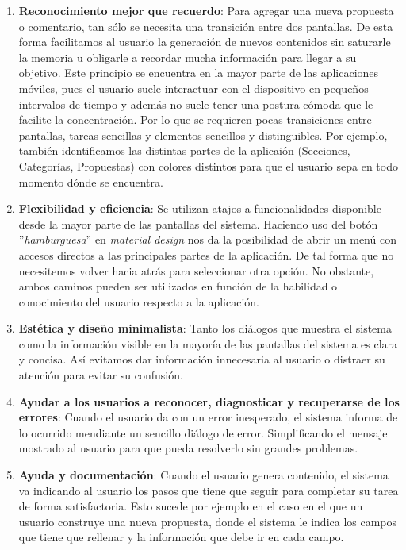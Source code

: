 \begin{enumerate}
  \item \textbf{Reconocimiento mejor que recuerdo}: Para agregar una nueva propuesta o comentario, tan sólo se necesita una transición entre dos pantallas. De esta forma facilitamos al usuario la generación de nuevos contenidos sin saturarle la memoria u obligarle a recordar mucha información para llegar a su objetivo. Este principio se encuentra en la mayor parte de las aplicaciones móviles, pues el usuario suele interactuar con el dispositivo en pequeños intervalos de tiempo y además no suele tener una postura cómoda que le facilite la concentración. Por lo que se requieren pocas transiciones entre pantallas, tareas sencillas y elementos sencillos y distinguibles. Por ejemplo, también identificamos las distintas partes de la aplicaión (Secciones, Categorías, Propuestas) con colores distintos para que el usuario sepa en todo momento dónde se encuentra.
  \item \textbf{Flexibilidad y eficiencia}: Se utilizan atajos a funcionalidades disponible desde la mayor parte de las pantallas del sistema. Haciendo uso del botón ''\textit{hamburguesa}'' en \textit{material design} nos da la posibilidad de abrir un menú con accesos directos a las principales partes de la aplicación. De tal forma que no necesitemos volver hacia atrás para seleccionar otra opción. No obstante, ambos caminos pueden ser utilizados en función de la habilidad o conocimiento del usuario respecto a la aplicación.
  \item \textbf{Estética y diseño minimalista}: Tanto los diálogos que muestra el sistema como la información visible en la mayoría de las pantallas del sistema es clara y concisa. Así evitamos dar información innecesaria al usuario o distraer su atención para evitar su confusión.
  \item \textbf{Ayudar a los usuarios a reconocer, diagnosticar y recuperarse de los errores}: Cuando el usuario da con un error inesperado, el sistema informa de lo ocurrido mendiante un sencillo diálogo de error. Simplificando el mensaje mostrado al usuario para que pueda resolverlo sin grandes problemas.
  \item \textbf{Ayuda y documentación}: Cuando el usuario genera contenido, el sistema  va indicando al usuario los pasos que tiene que seguir para completar su tarea de forma satisfactoria. Esto sucede por ejemplo en el caso en el que un usuario construye una nueva propuesta, donde el sistema le indica los campos que tiene que rellenar y la información que debe ir en cada campo.
\end{enumerate}


